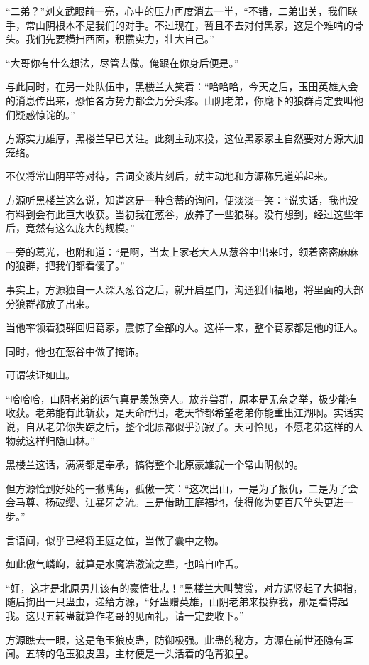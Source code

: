 \begin{this_body}
“二弟？”刘文武眼前一亮，心中的压力再度消去一半，“不错，二弟出关，我们联手，常山阴根本不是我们的对手。不过现在，暂且不去对付黑家，这是个难啃的骨头。我们先要横扫西面，积攒实力，壮大自己。”

“大哥你有什么想法，尽管去做。俺跟在你身后便是。”

与此同时，在另一处队伍中，黑楼兰大笑着：“哈哈哈，今天之后，玉田英雄大会的消息传出来，恐怕各方势力都会万分头疼。山阴老弟，你麾下的狼群肯定要叫他们疑惑惊诧的。”

方源实力雄厚，黑楼兰早已关注。此刻主动来投，这位黑家家主自然要对方源大加笼络。

不仅将常山阴平等对待，言词交谈片刻后，就主动地和方源称兄道弟起来。

方源听黑楼兰这么说，知道这是一种含蓄的询问，便淡淡一笑：“说实话，我也没有料到会有此巨大收获。当初我在葱谷，放养了一些狼群。没有想到，经过这些年后，竟然有这么庞大的规模。”

一旁的葛光，也附和道：“是啊，当太上家老大人从葱谷中出来时，领着密密麻麻的狼群，把我们都看傻了。”

事实上，方源独自一人深入葱谷之后，就开启星门，沟通狐仙福地，将里面的大部分狼群都放了出来。

当他率领着狼群回归葛家，震惊了全部的人。这样一来，整个葛家都是他的证人。

同时，他也在葱谷中做了掩饰。

可谓铁证如山。

“哈哈哈，山阴老弟的运气真是羡煞旁人。放养兽群，原本是无奈之举，极少能有收获。老弟能有此斩获，是天命所归，老天爷都希望老弟你能重出江湖啊。实话实说，自从老弟你失踪之后，整个北原都似乎沉寂了。天可怜见，不愿老弟这样的人物就这样归隐山林。”

黑楼兰这话，满满都是奉承，搞得整个北原豪雄就一个常山阴似的。

但方源恰到好处的一撇嘴角，孤傲一笑：“这次出山，一是为了报仇，二是为了会会马尊、杨破缨、江暴牙之流。三是借助王庭福地，使得修为更百尺竿头更进一步。”

言语间，似乎已经将王庭之位，当做了囊中之物。

如此傲气嶙峋，就算是水魔浩激流之辈，也暗自咋舌。

“好，这才是北原男儿该有的豪情壮志！”黑楼兰大叫赞赏，对方源竖起了大拇指，随后掏出一只蛊虫，递给方源，“好蛊赠英雄，山阴老弟来投靠我，那是看得起我。这只五转蛊就算作老哥的见面礼，请一定要收下。”

方源瞧去一眼，这是龟玉狼皮蛊，防御极强。此蛊的秘方，方源在前世还隐有耳闻。五转的龟玉狼皮蛊，主材便是一头活着的龟背狼皇。


\end{this_body}
